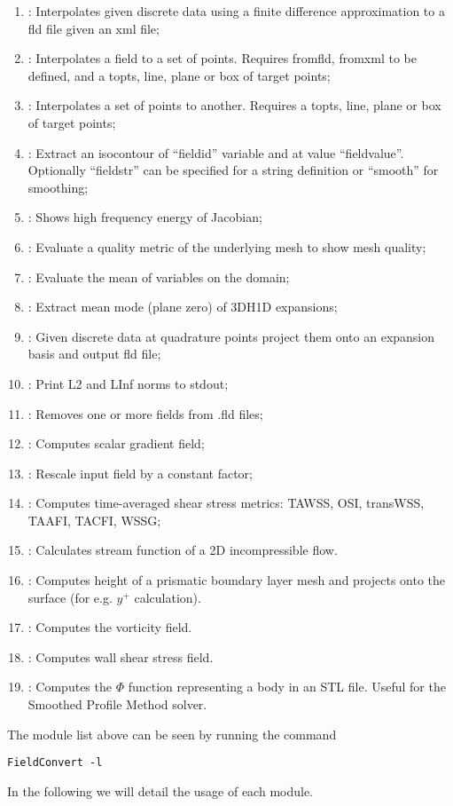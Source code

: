 \begin{enumerate}
\item {}: Interpolates given discrete data using a finite difference approximation to a fld file given an xml file;
\item {}: Interpolates a field to a set of points. Requires fromfld, fromxml to be defined, and a topts, line, plane or box of target points;
\item {}: Interpolates a set of points to another. Requires a topts, line, plane or box of target points;
\item {}: Extract an isocontour of ``fieldid'' variable and at value ``fieldvalue''. Optionally ``fieldstr'' can be specified for a string definition or ``smooth'' for smoothing;
\item {}: Shows high frequency energy of Jacobian;
\item {}: Evaluate a quality metric of the underlying mesh to show mesh quality;
\item {}: Evaluate the mean of variables on the domain;
\item {}: Extract mean mode (plane zero) of 3DH1D expansions;
\item {}: Given discrete data at quadrature points
  project them onto an expansion basis and output fld file;
\item {}: Print L2 and LInf norms to stdout;
\item {}: Removes one or more fields from .fld files;
\item {}: Computes scalar gradient field;
\item {}: Rescale input field by a constant factor;
\item {}: Computes time-averaged shear stress metrics: TAWSS, OSI, transWSS, TAAFI, TACFI, WSSG;
\item {}: Calculates stream function of a 2D incompressible flow.
\item {}: Computes height of a prismatic boundary layer mesh and projects onto the surface (for e.g. $y^+$ calculation).
\item {}: Computes the vorticity field.
\item {}: Computes wall shear stress field.
\item {}: Computes the $\Phi$ function representing a body in an STL file. Useful for the Smoothed Profile Method solver.
\end{enumerate}
The module list above can be seen by running the command
%
\begin{lstlisting}[style=BashInputStyle]
FieldConvert -l
\end{lstlisting}
%
In the following we will detail the usage of each module.
%
%
%

